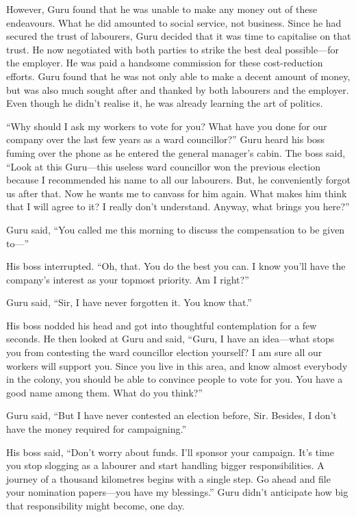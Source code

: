 However, Guru found that he was unable to make any money out of these endeavours.
What he did amounted to social service, not business. Since he had secured the
trust of labourers, Guru decided that it was time to capitalise on that trust. He now
negotiated with both parties to strike the best deal possible—for the
employer. He was paid a handsome commission for these cost-reduction efforts.
Guru found that he was not only able to make a decent amount of money, but was
also much sought after and thanked by both labourers and the employer. Even
though he didn't realise it, he was already learning the art of politics.

“Why should I ask my workers to vote for you? What have you done for our company
over the last few years as a ward councillor?” Guru heard his boss fuming over
the phone as he entered the general manager's cabin. The boss said, “Look at
this Guru—this useless ward councillor won the previous election because I
recommended his name to all our labourers. But, he conveniently forgot us
after that. Now he wants me to canvass for him again. What makes him think that
I will agree to it? I really don't understand. Anyway, what brings you here?”

Guru said, “You called me this morning to discuss the compensation to be
given to—”

His boss interrupted. “Oh, that. You do the best you can. I know you'll have
the company's interest as your topmost priority. Am I right?”

Guru said, “Sir, I have never forgotten it. You know that.”

His boss nodded his head and got into thoughtful contemplation for a few
seconds. He then looked at Guru and said, “Guru, I have an idea—what stops you
from contesting the ward councillor election yourself? I am sure all our workers
will support you. Since you live in this area, and know almost everybody in
the colony, you should be able to convince people to vote for you. You have a
good name among them. What do you think?”

Guru said, “But I have never contested an election before, Sir. Besides, I don't
have the money required for campaigning.”

His boss said, “Don't worry about funds. I'll sponsor your campaign. It's time
you stop slogging as a labourer and start handling bigger responsibilities. A
journey of a thousand kilometres begins with a single step. Go ahead and file your
nomination papers—you have my blessings.” Guru didn't anticipate how big that
responsibility might become, one day.

